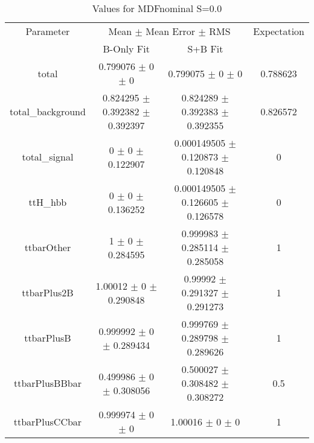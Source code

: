 \begin{table}
\centering
\caption{Values for MDFnominal S=0.0}
\begin{tabular}{cccc}
\toprule
Parameter & \multicolumn{2}{c}{Mean $\pm$ Mean Error $\pm$ RMS} & Expectation\\
 & B-Only Fit & S+B Fit & \\
\midrule
total & \num{0.799076} $\pm$ \num{0} $\pm$ \num{0} & \num{0.799075} $\pm$ \num{0} $\pm$ \num{0} & \num{0.788623}\\
total\_background & \num{0.824295} $\pm$ \num{0.392382} $\pm$ \num{0.392397} & \num{0.824289} $\pm$ \num{0.392383} $\pm$ \num{0.392355} & \num{0.826572}\\
total\_signal & \num{0} $\pm$ \num{0} $\pm$ \num{0.122907} & \num{0.000149505} $\pm$ \num{0.120873} $\pm$ \num{0.120848} & \num{0}\\
ttH\_hbb & \num{0} $\pm$ \num{0} $\pm$ \num{0.136252} & \num{0.000149505} $\pm$ \num{0.126605} $\pm$ \num{0.126578} & \num{0}\\
ttbarOther & \num{1} $\pm$ \num{0} $\pm$ \num{0.284595} & \num{0.999983} $\pm$ \num{0.285114} $\pm$ \num{0.285058} & \num{1}\\
ttbarPlus2B & \num{1.00012} $\pm$ \num{0} $\pm$ \num{0.290848} & \num{0.99992} $\pm$ \num{0.291327} $\pm$ \num{0.291273} & \num{1}\\
ttbarPlusB & \num{0.999992} $\pm$ \num{0} $\pm$ \num{0.289434} & \num{0.999769} $\pm$ \num{0.289798} $\pm$ \num{0.289626} & \num{1}\\
ttbarPlusBBbar & \num{0.499986} $\pm$ \num{0} $\pm$ \num{0.308056} & \num{0.500027} $\pm$ \num{0.308482} $\pm$ \num{0.308272} & \num{0.5}\\
ttbarPlusCCbar & \num{0.999974} $\pm$ \num{0} $\pm$ \num{0} & \num{1.00016} $\pm$ \num{0} $\pm$ \num{0} & \num{1}\\
\bottomrule
\end{tabular}
\end{table}